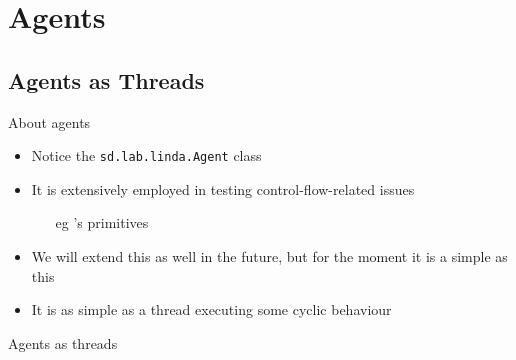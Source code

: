 \documentclass[presentation]{beamer}\mode<presentation>{\usetheme{AMSCesenaPurpleAndGold}}
\begin{document}
\section{Agents}

\subsection{Agents as Threads}

\begin{frame}{About agents}
\begin{itemize}
	\item Notice the \texttt{sd.lab.linda.\alert{Agent}} class
	
	\vfill
	
	\item It is extensively employed in testing control-flow-related issues
	\begin{itemize}
		\item[eg] \linda{}'s primitives
	\end{itemize}
	
	\vfill
	
	\item We will extend this as well in the future, but for the moment it is a simple as this
	
	\vfill
	
	\item It is as simple as a thread executing some \alert{cyclic} behaviour
	
\end{itemize}
\end{frame}

\begin{frame}[allowframebreaks]{Agents as threads}

\end{frame}

\section*{}

\frame{\titlepage}
\end{document}
